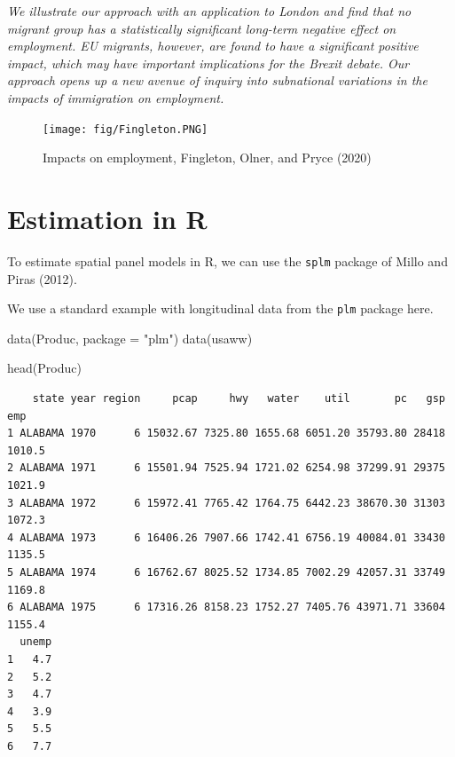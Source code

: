 \documentclass[
  letterpaper,
]{scrbook}
\newenvironment{Shaded}{\begin{snugshade}}{\end{snugshade}}
\newcommand{\AttributeTok}[1]{\textcolor[rgb]{0.40,0.45,0.13}{#1}}
\newcommand{\FunctionTok}[1]{\textcolor[rgb]{0.28,0.35,0.67}{#1}}
\newcommand{\NormalTok}[1]{\textcolor[rgb]{0.00,0.23,0.31}{#1}}
\newcommand{\StringTok}[1]{\textcolor[rgb]{0.13,0.47,0.30}{#1}}
\begin{document}
\emph{We illustrate our approach with an application to London and find
that no migrant group has a statistically significant long-term negative
effect on employment. EU migrants, however, are found to have a
significant positive impact, which may have important implications for
the Brexit debate. Our approach opens up a new avenue of inquiry into
subnational variations in the impacts of immigration on employment.}

\begin{figure}

{\centering \texttt{[image: fig/Fingleton.PNG]}

}

\caption{Impacts on employment, Fingleton, Olner, and Pryce (2020)}

\end{figure}

\hypertarget{estimation-in-r}{%
\section{Estimation in R}\label{estimation-in-r}}

To estimate spatial panel models in R, we can use the \texttt{splm}
package of Millo and Piras (2012).

We use a standard example with longitudinal data from the \texttt{plm}
package here.

\begin{Shaded}
\begin{Highlighting}[]
\FunctionTok{data}\NormalTok{(Produc, }\AttributeTok{package =} \StringTok{"plm"}\NormalTok{)}
\FunctionTok{data}\NormalTok{(usaww)}

\FunctionTok{head}\NormalTok{(Produc)}
\end{Highlighting}
\end{Shaded}

\begin{verbatim}
    state year region     pcap     hwy   water    util       pc   gsp    emp
1 ALABAMA 1970      6 15032.67 7325.80 1655.68 6051.20 35793.80 28418 1010.5
2 ALABAMA 1971      6 15501.94 7525.94 1721.02 6254.98 37299.91 29375 1021.9
3 ALABAMA 1972      6 15972.41 7765.42 1764.75 6442.23 38670.30 31303 1072.3
4 ALABAMA 1973      6 16406.26 7907.66 1742.41 6756.19 40084.01 33430 1135.5
5 ALABAMA 1974      6 16762.67 8025.52 1734.85 7002.29 42057.31 33749 1169.8
6 ALABAMA 1975      6 17316.26 8158.23 1752.27 7405.76 43971.71 33604 1155.4
  unemp
1   4.7
2   5.2
3   4.7
4   3.9
5   5.5
6   7.7
\end{verbatim}
\end{document}
